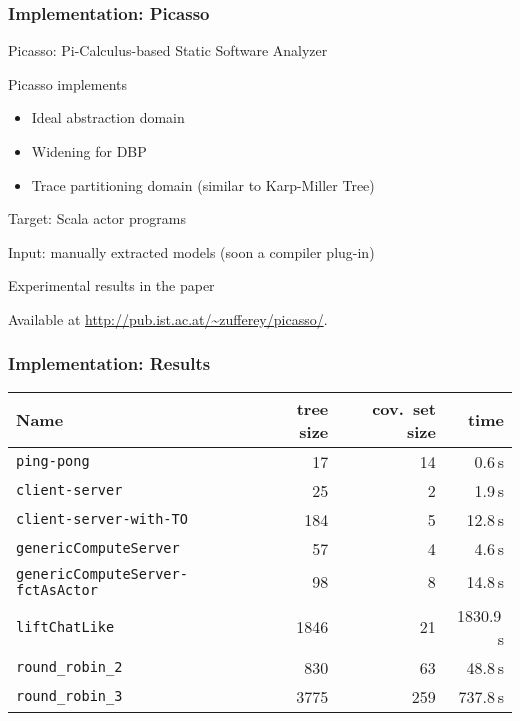 \documentclass{beamer}
\begin{document}
\begin{frame}
  \frametitle{Implementation: Picasso}
  Picasso: Pi-Calculus-based Static Software Analyzer

  \vspace{1ex}

  Picasso implements 
  \begin{itemize}
  \item Ideal abstraction domain
  \item Widening for DBP
  \item Trace partitioning domain \cite{DBLP:journals/toplas/RivalM07} (similar to Karp-Miller Tree)
  \end{itemize}

  \vspace{1ex}

  Target: Scala actor programs

  \vspace{0.5ex}

  Input: manually extracted models (soon a compiler plug-in)

  \vspace{0.5ex}
  
  Experimental results in the paper
  
  \vspace{0.5ex}

  Available at \url{http://pub.ist.ac.at/~zufferey/picasso/}.

\end{frame}

\begin{frame}
  \frametitle{Implementation: Results}
{\footnotesize
\begin{tabular}{|l|r|r|r|}
\hline
Name &  tree size & cov.~set size & time \\
\hline
\hline
\texttt{ping-pong} & 17 & 14 & 0.6\,s \\
\hline
\texttt{client-server} & 25 & 2 & 1.9\,s \\
\hline
\texttt{client-server-with-TO} & 184 & 5 & 12.8\,s \\
\hline
\texttt{genericComputeServer} & 57 & 4 & 4.6\,s \\
\hline
\texttt{genericComputeServer-fctAsActor} & 98 & 8 & 14.8\,s \\
\hline
\texttt{liftChatLike} & 1846 & 21 & 1830.9\,s \\
\hline
\texttt{round\_robin\_2} & 830 & 63 & 48.8\,s \\
\hline
\texttt{round\_robin\_3} & 3775 & 259 &  737.8\,s \\
\hline 
\end{tabular}
}
\end{frame}
\end{document}
